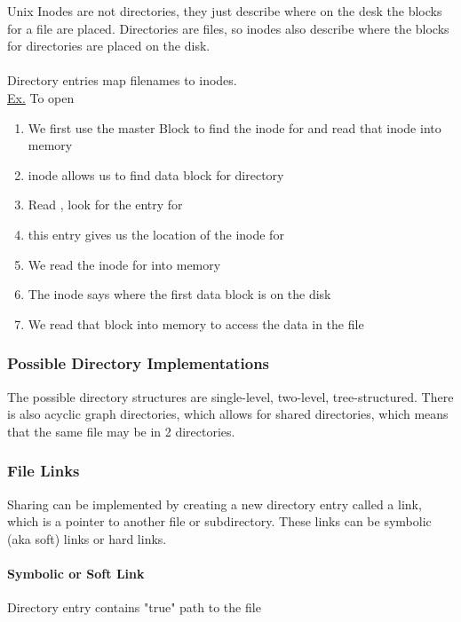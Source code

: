 \documentclass{article}
\begin{document}
Unix Inodes are not directories, they just describe where on the desk the blocks for a file are placed. Directories are files, so inodes also describe where the blocks for directories are placed on the disk.
\\
\\
Directory entries map filenames to inodes.
\\
\underline{Ex.} To open 
\begin{enumerate}
    \item We first use the master Block to find the inode for \codeword{/} and read that inode into memory

    \item inode allows us to find data block for directory \codeword{/}

    \item Read \codeword{/}, look for the entry for 

    \item this entry gives us the location of the inode for 

    \item We read the inode for  into memory

    \item The inode says where the first data block is on the disk

    \item We read that block into memory to access the data in the file
\end{enumerate}

\subsubsection{Possible Directory Implementations}

The possible directory structures are single-level, two-level, tree-structured. There is also acyclic graph directories, which allows for shared directories, which means that the same file may be in 2 directories.

\subsubsection{File Links}

Sharing can be implemented by creating a new directory entry called a link, which is a pointer to another file or subdirectory. These links can be symbolic (aka soft) links or hard links.

\paragraph{Symbolic or Soft Link} Directory entry contains "true" path to the file
\end{document}
